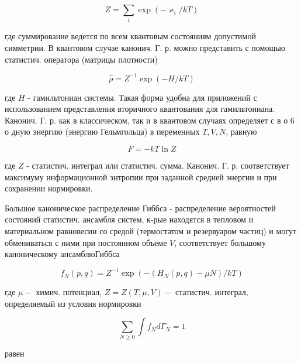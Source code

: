\documentclass[10pt]{article}
\begin{document}
\[

Z=\sum_{i} \exp \left(-\varkappa_{i} / k T\right)

\]



где суммирование ведется по всем квантовым состояниям допустимой симметрии. В квантовом случае канонич. Г. р. можно представить с помощью статистич. оператора (матрицы плотности)



\[

\hat{\rho}=Z^{-1} \exp (-H / k T)

\]



где $H$ - гамильтониан системы. Такая форма удобна для приложений с использованием представления вторичного квантования для гамильтониана. Канонич. Г. р. как в классическом, так и в квантовом случаях определяет с в о 6 о дную энергию (энергию Гельмгольца) в переменных $T, V, N$, равную



\[

F=-k T \ln Z

\]



где $Z$ - статистич. интеграл или статистич. сумма. Канонич. Г. р. соответствует максимуму информационной энтропии при заданной средней энергии и при сохранении нормировки.



Большое каноническое распределение Гиббса - распределение вероятностей состояний статистич. ансамбля систем, к-рые находятся в тепловом и материальном равновесии со средой (термостатом и резервуаром частиц) и могут обмениваться с ними при постоянном объеме $V$, соответствует большому каноническому ансамблюГиббса



\[

f_{N}(p, q)=Z^{-1} \exp \left(-\left(H_{N}(p, q)-\mu N\right) / k T\right)

\]



где $\mu-$ химич. потенциал, $Z=Z(T, \mu, V)-$ статистич. интеграл, определяемый из условия нормировки



\[

\sum_{N \geqslant 0} \int f_{N} d \Gamma_{N}=1

\]



равен
\end{document}
